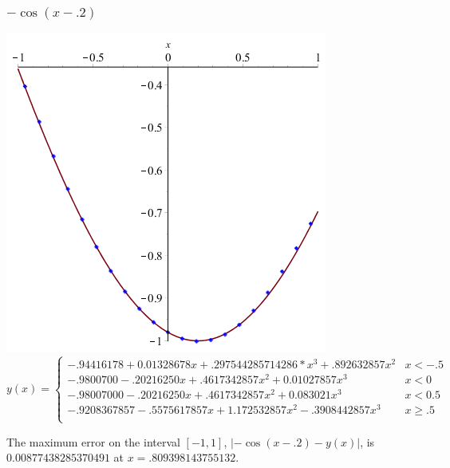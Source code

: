 \documentclass[11pt]{article} %
\begin{document}
\subsubsection*{$-\cos(x-.2)$}
\includegraphics[scale=.3]{plots/dataset1approx.png}
$$
y(x) = \left\{
        \begin{array}{ll}
            -.94416178+0.01328678x+.297544285714286*x^3+.892632857x^2 &  x < -.5 \\
            -.9800700-.20216250x+.4617342857x^2+0.01027857x^3 & x < 0 \\
 	-.98007000-.20216250x+.4617342857x^2+0.083021x^3 &  x < 0.5 \\
 	-.9208367857-.5575617857x+1.172532857x^2-.3908442857x^3 &  x \geq .5 \\
        \end{array}
    \right.
$$

The maximum error on the interval $[-1,1]$, $|-\cos(x-.2) - y(x)|$, is $0.00877438285370491$ at $x = .809398143755132$.
\end{document}
